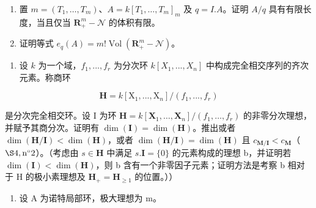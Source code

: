 \begin{enumerate}
\def\labelenumi{\alph{enumi})}
\tightlist
\item
  置 \(m = (T_1, \ldots, T_m)\)、\(A = k[T_1, \ldots, T_m]_m\) 及 \(q = I.A\)。证明 \(A/q\) 具有有限长度，当且仅当 \(\mathbf{R}_+^m - \mathcal{N}\) 的体积有限。
\item
  证明等式 \(e_q(A) = m! \operatorname{Vol}(\mathbf{R}_+^m - \mathcal{N})\)。
\end{enumerate}

\begin{enumerate}
\def\labelenumi{\arabic{enumi})}
\setcounter{enumi}{2}
\tightlist
\item
  设 \(k\) 为一个域，\(f_{1},...,f_{r}\) 为分次环 \(k[X_{1},...,X_{n}]\) 中构成完全相交序列的齐次元素。称商环
\end{enumerate}

\[
\mathbf {H} = k [ \mathrm{X} _ {1},..., \mathrm{X} _ {n} ] / (f _ {1},..., f _ {r})
\]

  是分次完全相交环。设 I 为环 \(\mathbf{H} = k[\mathbf{X}_1, \ldots, \mathbf{X}_n] / (f_1, \ldots, f_r)\) 的非零分次理想，并赋予其商分次。证明有 \(\dim(\mathbf{I}) = \dim(\mathbf{H})\)。推出或者 \(\dim(\mathbf{H}/\mathbf{I}) < \dim(\mathbf{H})\)，或者 \(\dim(\mathbf{H}/\mathbf{I}) = \dim(\mathbf{H})\) 且 \(c_{\mathbf{M}/\mathbf{I}} < c_{\mathbf{M}}\)（\(\S 4, \text{n}^{\circ} 2\)）。（考虑由 \(s \in \mathbf{H}\) 中满足 \(s.\mathbf{I} = \{0\}\) 的元素构成的理想 b，并证明若 \(\dim(\mathbf{I}) < \dim(\mathbf{H})\)，则 b 含有一个非零因子元素；证明方法是考察 b 相对于 H 的极小素理想及 \(\mathbf{H}_{+} = \mathbf{H}_{\geqslant 1}\) 的位置。））

\begin{enumerate}
\def\labelenumi{\arabic{enumi})}
\setcounter{enumi}{3}
\tightlist
\item
  设 A 为诺特局部环，极大理想为 m。
\end{enumerate}

